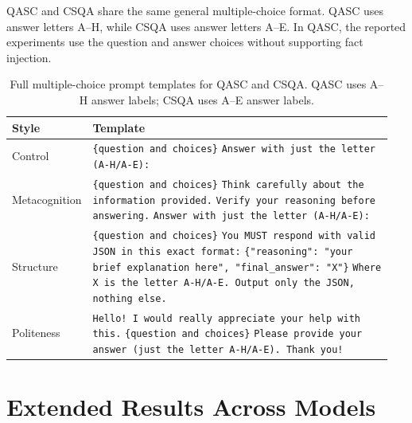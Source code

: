 \documentclass[11pt]{article}
\begin{document}
QASC and CSQA share the same general multiple-choice format. QASC uses answer letters A--H, while CSQA uses answer letters A--E. In QASC, the reported experiments use the question and answer choices without supporting fact injection.

\begin{table}[h]
\centering
\small
\setlength{\tabcolsep}{4pt}
\begin{tabular}{p{0.15\linewidth}p{0.80\linewidth}}
\toprule
Style & Template \\
\midrule
Control &
\texttt{\{question and choices\}} \newline
\texttt{Answer with just the letter (A-H/A-E):} \\[0.7em]

Metacognition &
\texttt{\{question and choices\}} \newline
\texttt{Think carefully about the information provided.} \newline
\texttt{Verify your reasoning before answering.} \newline
\texttt{Answer with just the letter (A-H/A-E):} \\[0.7em]

Structure &
\texttt{\{question and choices\}} \newline
\texttt{You MUST respond with valid JSON in this exact format:} \newline
\texttt{\{"reasoning": "your brief explanation here", "final\_answer": "X"\}} \newline
\texttt{Where X is the letter A-H/A-E. Output only the JSON, nothing else.} \\[0.7em]

Politeness &
\texttt{Hello! I would really appreciate your help with this.} \newline
\texttt{\{question and choices\}} \newline
\texttt{Please provide your answer (just the letter A-H/A-E). Thank you!} \\
\bottomrule
\end{tabular}
\caption{Full multiple-choice prompt templates for QASC and CSQA. QASC uses A--H answer labels; CSQA uses A--E answer labels.}
\label{tab:app-mc-prompts}
\end{table}

\clearpage
\section{Extended Results Across Models}
\label{app:extended-results}
\end{document}
